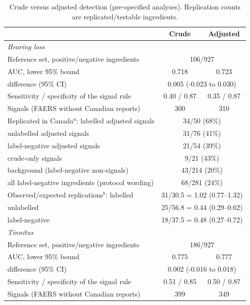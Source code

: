 \documentclass[11pt]{article}
\begin{document}
\begin{table}[t]
\centering\small
\caption{Crude versus adjusted detection (pre-specified analyses). Replication counts are replicated/testable ingredients.}
\label{tab:methods}
\begin{tabular}{p{8.6cm}cc}
\toprule
 & Crude & Adjusted \\
\midrule
\multicolumn{3}{l}{\textit{Hearing loss}} \\
Reference set, positive/negative ingredients & \multicolumn{2}{c}{106/927} \\
AUC, lower 95\% bound & 0.718 & 0.723 \\
\quad difference (95\% CI) & \multicolumn{2}{c}{0.005 (-0.023 to 0.030)} \\
Sensitivity / specificity of the signal rule & 0.40 / 0.87 & 0.35 / 0.87 \\
Signals (FAERS without Canadian reports) & 300 & 310 \\
Replicated in Canada$^a$: labelled adjusted signals & \multicolumn{2}{c}{34/50 (68\%)} \\
\quad unlabelled adjusted signals & \multicolumn{2}{c}{31/76 (41\%)} \\
\quad label-negative adjusted signals & \multicolumn{2}{c}{21/54 (39\%)} \\
\quad crude-only signals & \multicolumn{2}{c}{9/21 (43\%)} \\
\quad background (label-negative non-signals) & \multicolumn{2}{c}{43/214 (20\%)} \\
\quad all label-negative ingredients (protocol wording) & \multicolumn{2}{c}{68/281 (24\%)} \\
Observed/expected replications$^b$: labelled & \multicolumn{2}{c}{31/30.5 = 1.02 (0.77--1.32)} \\
\quad unlabelled & \multicolumn{2}{c}{25/56.8 = 0.44 (0.29--0.62)} \\
\quad label-negative & \multicolumn{2}{c}{18/37.5 = 0.48 (0.27--0.72)} \\
\midrule
\multicolumn{3}{l}{\textit{Tinnitus}} \\
Reference set, positive/negative ingredients & \multicolumn{2}{c}{186/927} \\
AUC, lower 95\% bound & 0.775 & 0.777 \\
\quad difference (95\% CI) & \multicolumn{2}{c}{0.002 (-0.016 to 0.018)} \\
Sensitivity / specificity of the signal rule & 0.51 / 0.85 & 0.50 / 0.87 \\
Signals (FAERS without Canadian reports) & 399 & 349 \\

\end{tabular}
\end{table}
\end{document}
